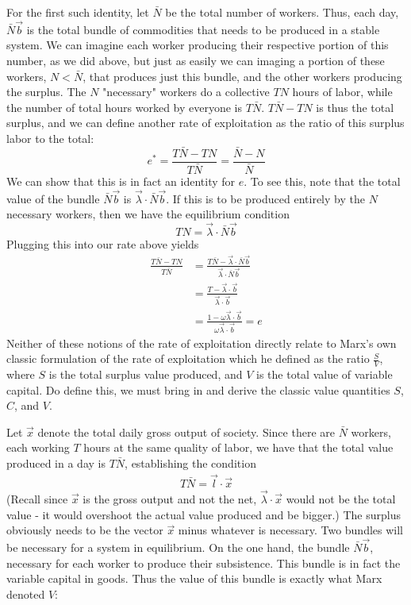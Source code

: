 \documentclass{article}
\theoremstyle{definition}
\theoremstyle{plain}
\theoremstyle{theorem}
\begin{document}
For the first such identity, let $\bar{N}$ be the total number of workers. Thus, each day, $\bar{N}\vec{b}$ is the total bundle of commodities that needs to be produced in a stable system. We can imagine each worker producing their respective portion of this number, as we did above, but just as easily we can imaging a portion of these workers, $N < \bar{N}$, that produces just this bundle, and the other workers producing the surplus. The $N$ "necessary" workers do a collective $TN$ hours of labor, while the number of total hours worked by everyone is $T\bar{N}$. $T\bar{N} - TN$ is thus the total surplus, and we can define another rate of exploitation as the ratio of this surplus labor to the total:
\[ e^* = \frac{T\bar{N} - TN}{T\bar{N}} = \frac{\bar{N} - N}{\bar{N}} \]
We can show that this is in fact an identity for $e$. To see this, note that the total value of the bundle $\bar{N}\vec{b}$ is $\vec{\lambda} \cdot \bar{N}\vec{b}$. If this is to be produced entirely by the $N$ necessary workers, then we have the equilibrium condition
\[ TN = \vec{\lambda} \cdot \bar{N}\vec{b} \]
Plugging this into our rate above yields
\begin{align*}
	 \frac{T\bar{N} - TN}{T\bar{N}} &=  \frac{T\bar{N} - \vec{\lambda} \cdot \bar{N}\vec{b}}{\vec{\lambda} \cdot \bar{N}\vec{b}} \\
	 &= \frac{T - \vec{\lambda} \cdot \vec{b}}{\vec{\lambda} \cdot \vec{b}} \\
	 &= \frac{1 - \omega \vec{\lambda} \cdot \vec{b}}{\omega\vec{\lambda}\cdot \vec{b}} = e
\end{align*}
Neither of these notions of the rate of exploitation directly relate to Marx's own classic formulation of the rate of exploitation which he defined as the ratio $\frac{S}{V}$, where $S$ is the total surplus value produced, and $V$ is the total value of variable capital. Do define this, we must bring in and derive the classic value quantities $S$, $C$, and $V$. \par 
Let $\vec{x}$ denote the total daily gross output of society. Since there are $\bar{N}$ workers, each working $T$ hours at the same quality of labor, we have that the total value produced in a day is $T\bar{N}$, establishing the condition
\begin{align}
	T\bar{N} = \vec{l}\cdot \vec{x}
\end{align}
(Recall since $\vec{x}$ is the gross output and not the net, $\vec{\lambda}\cdot \vec{x}$ would not be the total value - it would overshoot the actual value produced and be bigger.)
The surplus obviously needs to be the vector $\vec{x}$ minus whatever is necessary. Two bundles will be necessary for a system in equilibrium. On the one hand, the bundle $\bar{N}\vec{b}$, necessary for each worker to produce their subsistence. This bundle is in fact the variable capital in goods. Thus the value of this bundle is exactly what Marx denoted $V$:
\end{document}
